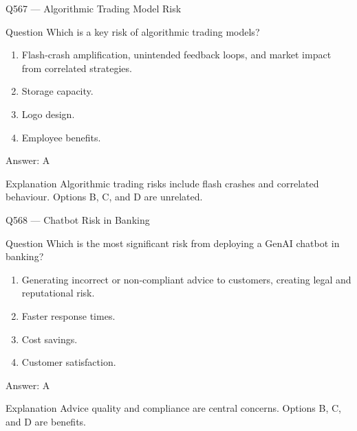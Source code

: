 \documentclass[aspectratio=169,8pt]{beamer}
\begin{document}
	\begin{frame}{Q567 --- Algorithmic Trading Model Risk}
		\begin{block}{Question}
			Which is a key risk of algorithmic trading models?
			\begin{enumerate}
				\item Flash-crash amplification, unintended feedback loops, and market impact from correlated strategies.
				\item Storage capacity.
				\item Logo design.
				\item Employee benefits.
			\end{enumerate}
		\end{block}
		\begin{exampleblock}{Answer: A}\end{exampleblock}
		\begin{block}{Explanation}
			Algorithmic trading risks include flash crashes and correlated behaviour. Options B, C, and D are unrelated.
		\end{block}
	\end{frame}
	
	\begin{frame}{Q568 --- Chatbot Risk in Banking}
		\begin{block}{Question}
			Which is the most significant risk from deploying a GenAI chatbot in banking?
			\begin{enumerate}
				\item Generating incorrect or non-compliant advice to customers, creating legal and reputational risk.
				\item Faster response times.
				\item Cost savings.
				\item Customer satisfaction.
			\end{enumerate}
		\end{block}
		\begin{exampleblock}{Answer: A}\end{exampleblock}
		\begin{block}{Explanation}
			Advice quality and compliance are central concerns. Options B, C, and D are benefits.
		\end{block}
	\end{frame}
	
\end{document}
